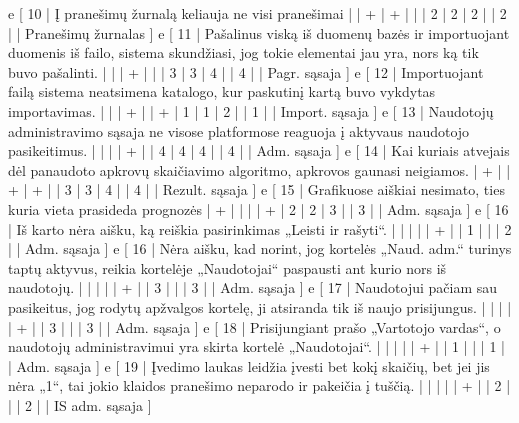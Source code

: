 {  e [ 10  | Į pranešimų žurnalą keliauja ne visi pranešimai
                    |   | + | + |   |   | 2 | 2 | 2 |   | 2 |      | Pranešimų žurnalas ]
  e [ 11  | Pašalinus viską iš duomenų bazės ir importuojant duomenis iš failo,
  sistema skundžiasi, jog tokie elementai jau yra, nors ką tik buvo pašalinti.
                    |   |   | + |   |   | 3 | 3 | 4 |   | 4 |      | Pagr. sąsaja ]
  e [ 12  | Importuojant failą sistema neatsimena katalogo, kur paskutinį
  kartą buvo vykdytas importavimas.
                    |   |   | + |   | + | 1 | 1 | 2 |   | 1 |      | Import. sąsaja ]
  e [ 13  | Naudotojų administravimo sąsaja ne visose platformose reaguoja į
  aktyvaus naudotojo pasikeitimus.
                    |   |   |   | + |   | 4 | 4 | 4 |   | 4 |      | Adm. sąsaja ]
  e [ 14  | Kai kuriais atvejais dėl panaudoto apkrovų skaičiavimo algoritmo,
  apkrovos gaunasi neigiamos.
                    | + |   | + | + |   | 3 | 3 | 4 |   | 4 |      | Rezult. sąsaja ]
  e [ 15 | Grafikuose aiškiai nesimato, ties kuria vieta prasideda prognozės
                    | + |   |   |   | + | 2 | 2 | 3 |   | 3 |      | Adm. sąsaja ]
  e [ 16 | Iš karto nėra aišku, ką reiškia pasirinkimas „Leisti ir rašyti“.
                    |   |   |   |   | + |   | 1 |   |   | 2 |      | Adm. sąsaja ]
  e [ 16 | Nėra aišku, kad norint, jog kortelės „Naud. adm.“ turinys taptų aktyvus,
  reikia kortelėje „Naudotojai“ paspausti ant kurio nors iš naudotojų.
                    |   |   |   |   | + |   | 3 |   |   | 3 |      | Adm. sąsaja ]
  e [ 17 | Naudotojui pačiam sau pasikeitus, jog rodytų apžvalgos kortelę, ji
  atsiranda tik iš naujo prisijungus.
                    |   |   |   |   | + |   | 3 |   |   | 3 |      | Adm. sąsaja ]
  e [ 18 | Prisijungiant prašo „Vartotojo vardas“, o naudotojų administravimui
  yra skirta kortelė „Naudotojai“.
                    |   |   |   |   | + |   | 1 |   |   | 1 |      | Adm. sąsaja ]
  e [ 19 | Įvedimo laukas leidžia įvesti bet kokį skaičių, bet jei jis nėra
  „1“, tai jokio klaidos pranešimo neparodo ir pakeičia į tuščią.
                    |   |   |   |   | + |   | 2 |   |   | 2 |      | IS adm. sąsaja ]
}
